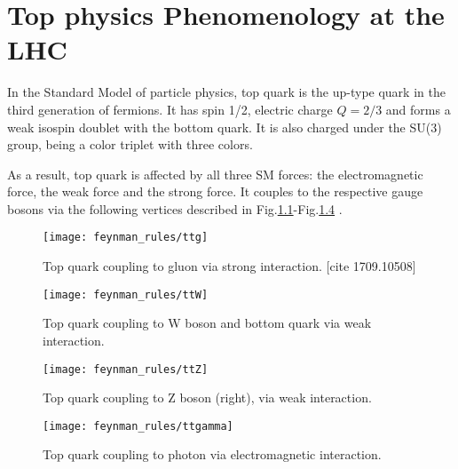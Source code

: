 \chapter{Top physics Phenomenology at the LHC}
\label{sec:phenomenology}

In the Standard Model of particle physics, top quark is the up-type quark in the third generation of fermions. It has spin 1/2, electric charge $Q=2/3$ and forms a weak isospin doublet with the bottom quark. It is also charged under the SU(3) group, being a color triplet with three colors. 

As a result, top quark is affected by all three SM forces: the electromagnetic force, the weak force and the strong force. It couples to the respective gauge bosons via the following vertices described in Fig.\ref{fig:ttg}-Fig.\ref{fig:ttgamma} .

\begin{figure}[hbt]
  \begin{center}
    \texttt{[image: feynman\_rules/ttg]}
  \caption{\small Top quark coupling to gluon via strong interaction.  [cite 1709.10508] }
    \label{fig:ttg}
  \end{center}
\end{figure}

\begin{figure}[hbt]
  \begin{center}
    \texttt{[image: feynman\_rules/ttW]}
  \caption{\small Top quark coupling to W boson and bottom quark via weak interaction.}
    \label{fig:ttW}
  \end{center}
\end{figure}

\begin{figure}[hbt]
  \begin{center}
    \texttt{[image: feynman\_rules/ttZ]}
  \caption{\small Top quark coupling to Z boson (right), via weak interaction.}
    \label{fig:ttZ}
  \end{center}
\end{figure}


\begin{figure}[hbt]
  \begin{center}
    \texttt{[image: feynman\_rules/ttgamma]}
  \caption{\small Top quark coupling to photon via electromagnetic interaction.}
    \label{fig:ttgamma}
  \end{center}
\end{figure}

